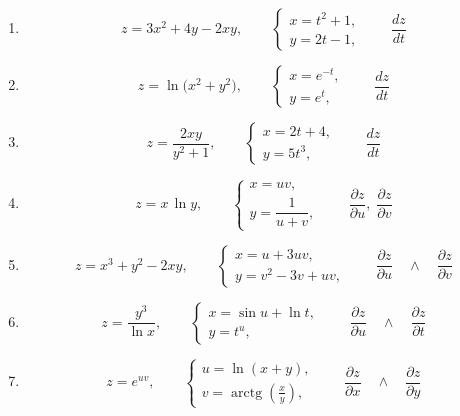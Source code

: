 \documentclass{article}
\begin{document}
\begin{enumerate}
  \item 
  \[
    z = 3x^2 + 4y - 2xy,
    \qquad
    \begin{cases}
      x = t^2 + 1,\\
      y = 2t - 1,
    \end{cases}
    \qquad
    \frac{dz}{dt}
  \]
  
  \item 
  \[
    z = \ln\bigl(x^2 + y^2\bigr),
    \qquad
    \begin{cases}
      x = e^{-t},\\
      y = e^{t},
    \end{cases}
    \qquad
    \frac{dz}{dt}
  \]
  
  \item 
  \[
    z = \frac{2xy}{y^2 + 1},
    \qquad
    \begin{cases}
      x = 2t + 4,\\
      y = 5t^3,
    \end{cases}
    \qquad
    \frac{dz}{dt}
  \]
  
  \item 
  \[
    z = x\,\ln y,
    \qquad
    \begin{cases}
      x = uv,\\
      y = \dfrac{1}{u + v},
    \end{cases}
    \qquad
    \frac{\partial z}{\partial u},\;\frac{\partial z}{\partial v}
  \]

   \item 
  \[
  z = x^3 + y^2 - 2xy,
  \qquad
  \begin{cases}
    x = u + 3uv, \\
    y = v^2 - 3v + uv,
  \end{cases}
  \qquad
  \frac{\partial z}{\partial u}
  \quad\land\quad
  \frac{\partial z}{\partial v}
  \]

  \item 
  \[
  z = \frac{y^3}{\ln x},
  \qquad
  \begin{cases}
    x = \sin u + \ln t, \\
    y = t^u,
  \end{cases}
  \qquad
  \frac{\partial z}{\partial u}
  \quad\land\quad
  \frac{\partial z}{\partial t}
  \]

  \item 
  \[
  z = e^{uv},
  \qquad
  \begin{cases}
    u = \ln(x + y), \\
    v = \operatorname{arctg}\left(\frac{x}{y}\right),
  \end{cases}
  \qquad
  \frac{\partial z}{\partial x}
  \quad\land\quad
  \frac{\partial z}{\partial y}
  \]
\end{enumerate}
\end{document}

